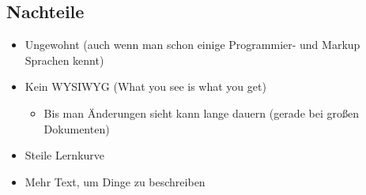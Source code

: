 \documentclass[
    ngerman,
    accentcolor=3b,
    dark_mode,
    fontsize= 12pt,
    a4paper,
    aspectratio=169,
    colorback=true,
    fancy_row_colors,
    leqno,
    fleqn,
    boxarc=3pt,
    fleqn,
]{algoslides}
\begin{document}
    \subsection{Nachteile}\label{2.2}\label{2.2}
    \begin{frame}
        \slidehead{}
        \begin{itemize}
            \item Ungewohnt (auch wenn man schon einige Programmier- und Markup Sprachen kennt)
            \item Kein WYSIWYG (What you see is what you get)
                \begin{itemize}
                    \item Bis man Änderungen sieht kann lange dauern (gerade bei großen Dokumenten)
                \end{itemize}
            \item Steile Lernkurve
            \item Mehr Text, um Dinge zu beschreiben
        \end{itemize}
    \end{frame}
\end{document}
